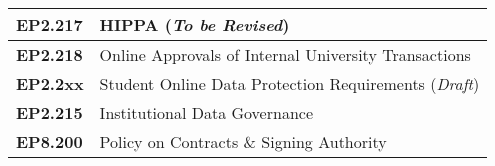 \begin{frame}
{{\begin{tabular}{l||l}
        \midrule
        \textbf{EP2.217} & HIPPA (\textit{To be Revised}) \\
        \midrule
        \textbf{EP2.218} & Online Approvals of Internal University Transactions\\
        \midrule
        \textbf{EP2.2xx} & Student Online Data Protection Requirements (\textit{Draft}) \\
        \midrule
        \textbf{EP2.215} & Institutional Data Governance \\
        \midrule
        \textbf{EP8.200} & Policy on Contracts \& Signing Authority \\
        \bottomrule
      \end{tabular}%
      }
}
\vspace{-5pt}


\end{frame}  






